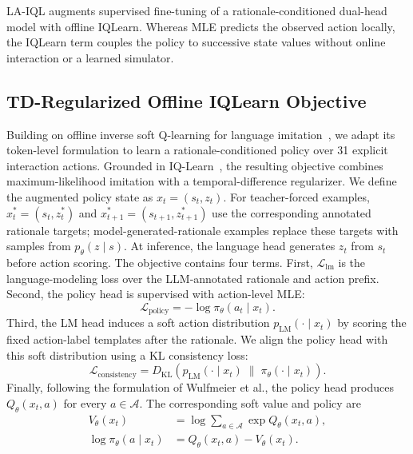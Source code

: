 \documentclass[manuscript,review,anonymous]{acmart}
\begin{document}
LA-IQL augments supervised fine-tuning of a rationale-conditioned dual-head model with offline IQLearn. Whereas MLE predicts the observed action locally, the IQLearn term couples the policy to successive state values without online interaction or a learned simulator.

\subsection{TD-Regularized Offline IQLearn Objective}

Building on offline inverse soft Q-learning for language
imitation~\citep{wulfmeier2024imitating}, we adapt its token-level formulation
to learn a rationale-conditioned policy over 31 explicit interaction actions.
Grounded in IQ-Learn~\citep{garg2021iqlearn}, the resulting objective combines
maximum-likelihood imitation with a temporal-difference regularizer.
We define the augmented policy state as $x_t=(s_t,z_t)$. For teacher-forced examples, $x_t^*=(s_t,z_t^*)$ and $x_{t+1}^*=(s_{t+1},z_{t+1}^*)$ use the corresponding annotated rationale targets; model-generated-rationale examples replace these targets with samples from $p_\theta(z\mid s)$. At inference, the language head generates $z_t$ from $s_t$ before action scoring.
The objective contains four terms.
First, $\mathcal{L}_{\mathrm{lm}}$ is the language-modeling loss over the LLM-annotated rationale and action prefix.
Second, the policy head is supervised with action-level MLE:
\begin{equation}
\mathcal{L}_{\mathrm{policy}}
=
-\log \pi_\theta(a_t\mid x_t).
\end{equation}
Third, the LM head induces a soft action distribution $p_{\mathrm{LM}}(\cdot\mid x_t)$ by scoring the fixed action-label templates after the rationale.
We align the policy head with this soft distribution using a KL consistency loss:
\begin{equation}
\mathcal{L}_{\mathrm{consistency}}
=
D_{\mathrm{KL}}\!\left(
p_{\mathrm{LM}}(\cdot\mid x_t)
\;\|\;
\pi_\theta(\cdot\mid x_t)
\right).
\end{equation}
Finally, following the formulation of Wulfmeier et al., the policy head produces $Q_\theta(x_t,a)$ for every $a\in\mathcal{A}$.
The corresponding soft value and policy are
\begin{equation}
\begin{aligned}
V_\theta(x_t)
&=\log\!\sum_{a\in\mathcal{A}}\exp Q_\theta(x_t,a),\\
\log\pi_\theta(a\mid x_t)
&=Q_\theta(x_t,a)-V_\theta(x_t).
\end{aligned}
\end{equation}
\end{document}

